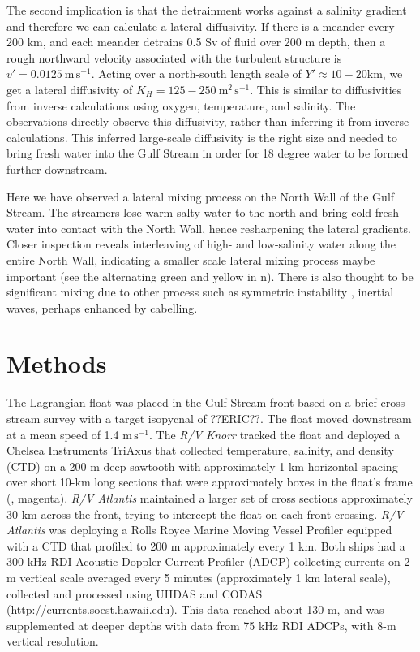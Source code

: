 \documentclass{natureJMK}
\begin{document}
The second implication is that the detrainment works against a salinity gradient and therefore we can calculate a lateral diffusivity.  If there is a meander every 200 km, and each meander detrains 0.5 Sv of fluid over 200 m depth, then a rough northward velocity associated with the turbulent structure is $v'=0.0125\ \mathrm{m\,s^{-1}}$.  Acting over a north-south length scale of $Y'\approx 10-20 \mathrm{km}$, we get a lateral diffusivity of $K_H=125-250\ \mathrm{m^2\,s^{-1}}$.  This is similar to diffusivities from inverse calculations using oxygen, temperature, and salinity\cite{boweretal85,joyceetal13}. The observations directly observe this diffusivity, rather than inferring it from inverse calculations. This inferred large-scale diffusivity is the right size and needed to bring fresh water into the Gulf Stream in order for 18 degree water to be formed further downstream.\cite{joyceetal13}

Here we have observed a  lateral mixing process on the North Wall of the Gulf Stream.  The streamers lose warm salty water to the north and bring cold fresh water into contact with the North Wall, hence resharpening the lateral gradients.  Closer inspection reveals interleaving of high- and low-salinity water along the entire North Wall, indicating a smaller scale lateral mixing process maybe important (see the alternating green and yellow in n).  There is also thought to be significant mixing due to other process such as symmetric instability \cite{thomasetal15}, inertial waves\cite{whittthomas13}, perhaps enhanced by cabelling.  


\section{Methods}

The Lagrangian float was placed in the Gulf Stream front based on a brief cross-stream survey with a target isopycnal of ??ERIC??.  The float moved downstream at a mean speed of 1.4 $\mathrm{m\,s^{-1}}$.  The \emph{R/V Knorr} tracked the float and deployed a Chelsea Instruments TriAxus that  collected temperature, salinity, and density (CTD) on a 200-m deep sawtooth with approximately 1-km horizontal spacing over short 10-km long sections that were approximately boxes in the float's frame (, magenta).  \emph{R/V Atlantis} maintained a larger set of cross sections approximately 30 km across the front, trying to intercept the float on each front crossing.  \emph{R/V Atlantis} was deploying a Rolls Royce Marine Moving Vessel Profiler equipped with a CTD that profiled to 200 m approximately every 1 km.  Both ships had a 300 kHz RDI Acoustic Doppler Current Profiler (ADCP) collecting currents on 2-m vertical scale averaged every 5 minutes (approximately 1 km lateral scale), collected and processed using UHDAS and CODAS (http://currents.soest.hawaii.edu\cite{firingetal12}).  This data reached about 130 m, and was supplemented at deeper depths with data from 75 kHz RDI ADCPs, with 8-m vertical resolution.  
\end{document}

